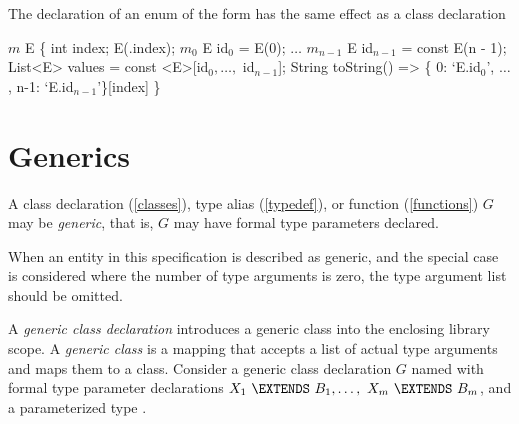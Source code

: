 \documentclass{article}
\begin{document}
\LMHash{}
The declaration of an enum of the form
has the same effect as a class declaration

\begin{dartCode}
$m$ \CLASS{} E \{
  \FINAL{} int index;
  \CONST{} E(\THIS{}.index);
  $m_0$ \STATIC{} \CONST{} E id$_0$ = \CONST{} E(0);
  $\ldots$
  $m_{n-1}$ \STATIC{} \CONST{} E id$_{n-1}$ = const E(n - 1);
  \STATIC{} \CONST{} List<E> values = const <E>[id$_0, \ldots, $ id$_{n-1}$];
  String toString() => \{ 0: `E.id$_0$', $\ldots$, n-1: `E.id$_{n-1}$'\}[index]
\}
\end{dartCode}



\section{Generics}

\LMHash{}
A class declaration (\ref{classes}), type alias (\ref{typedef}), or function (\ref{functions}) $G$ may be {\em generic}, that is, $G$ may have formal type parameters declared.

\LMHash{}
When an entity in this specification is described as generic,
and the special case is considered where the number of type arguments is zero,
the type argument list should be omitted.


\LMHash{}
A {\em generic class declaration} introduces a generic class into the enclosing library scope.
A {\em generic class} is a mapping that accepts a list of actual type arguments and maps them to a class.
Consider a generic class declaration $G$ named  with formal type parameter declarations
$X_1\ \EXTENDS\ B_1, \ldots,\ X_m\ \EXTENDS\ B_m$,
and a parameterized type .
\end{document}
